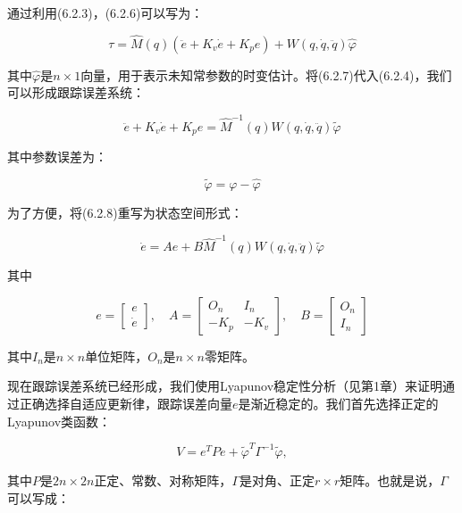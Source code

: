 \documentclass[12pt,a4paper]{ctexart}
\begin{document}
通过利用(6.2.3)，(6.2.6)可以写为：

\begin{equation}\label{eq:6.2.7}
\tau = \hat{M}(q)(\ddot{e} + K_v \dot{e} + K_p e) + W(q, \dot{q}, \ddot{q}) \hat{\varphi}
\end{equation}

其中$\hat{\varphi}$是$n \times 1$向量，用于表示未知常参数的时变估计。将(6.2.7)代入(6.2.4)，我们可以形成跟踪误差系统：

\begin{equation}\label{eq:6.2.8}
\ddot{e} + K_v \dot{e} + K_p e = \hat{M}^{-1}(q) W(q, \dot{q}, \ddot{q}) \tilde{\varphi}
\end{equation}

其中参数误差为：

\begin{equation}\label{eq:6.2.9}
\tilde{\varphi} = \varphi - \hat{\varphi}
\end{equation}

为了方便，将(6.2.8)重写为状态空间形式：

\begin{equation}\label{eq:6.2.10}
\dot{e} = Ae + B\hat{M}^{-1}(q)W(q,\dot{q},\ddot{q})\tilde{\varphi}
\end{equation}

其中

\begin{equation}
e = \begin{bmatrix} e \\ \dot{e} \end{bmatrix}, \quad
A = \begin{bmatrix} O_n & I_n \\ -K_p & -K_v \end{bmatrix}, \quad
B = \begin{bmatrix} O_n \\ I_n \end{bmatrix}
\end{equation}

其中$I_n$是$n \times n$单位矩阵，$O_n$是$n \times n$零矩阵。

现在跟踪误差系统已经形成，我们使用Lyapunov稳定性分析（见第1章）来证明通过正确选择自适应更新律，跟踪误差向量$e$是渐近稳定的。我们首先选择正定的Lyapunov类函数：

\begin{equation}\label{eq:6.2.11}
V = e^T P e + \tilde{\varphi}^T \Gamma^{-1} \tilde{\varphi},
\end{equation}

其中$P$是$2n \times 2n$正定、常数、对称矩阵，$\Gamma$是对角、正定$r \times r$矩阵。也就是说，$\Gamma$可以写成：
\end{document}
